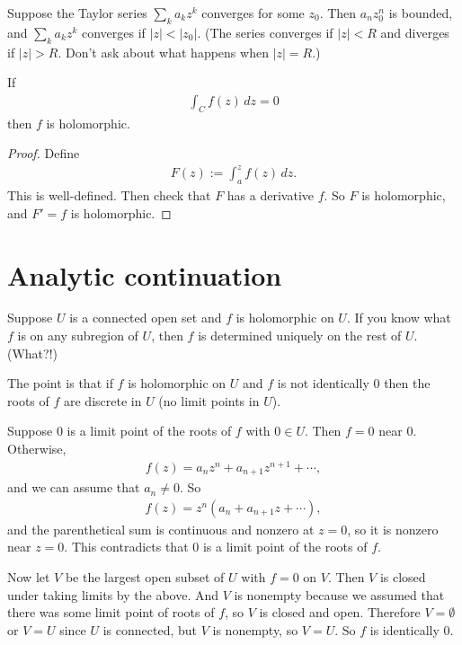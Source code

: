 \documentclass[11pt, oneside,margin=1in]{article}
\begin{document}
Suppose the Taylor series $\sum_{k}^{} a_kz^k$ converges for some $z_0$. Then $a_nz_0^n$ is bounded, and $\sum_{k}^{} a_kz^k$ converges if $\left\lvert z \right\rvert <\left\lvert z_0 \right\rvert $. (The series converges if $\left\lvert z \right\rvert < R$ and diverges if $\left\lvert z \right\rvert > R$. Don't ask about what happens when $\left\lvert z \right\rvert =R$.)

\begin{theorem}[Morera]\label{}\index{}\text{}
If 
\begin{align*}
	\int_{C}^{} f(z)  \, dz = 0 
\end{align*}
then $f$ is holomorphic.
\end{theorem}
\begin{proof}
Define
\begin{align*}
	F(z) :=  \int_{a}^{z} f(z)  \, dz. 
\end{align*}
This is well-defined. Then check that $F$ has a derivative $f$. So $F$ is holomorphic, and $F'=f$ is holomorphic.
\end{proof}


\section{Analytic continuation}
Suppose $U$ is a connected open set and $f$ is holomorphic on $U$. If you know what $f$ is on any subregion of $U$, then $f$ is determined uniquely on the rest of $U$. (What?!)

The point is that if $f$ is holomorphic on $U$ and $f$ is not identically $0$ then the roots of $f$ are discrete in $U$ (no limit points in $U$).

Suppose $0$ is a limit point of the roots of $f$ with $0\in U$. Then  $f=0$ near $0$. Otherwise, 
\begin{align*}
	f(z) =  a_nz^n + a_{n+1}z^{n+1} + \cdots,
\end{align*}
and we can assume that $a_n \ne 0$. So 
\begin{align*}
	f(z) = z^n (a_n + a_{n+1}z + \cdots),
\end{align*}
and the parenthetical sum is continuous and nonzero at $z=0$, so it is nonzero near $z=0$. This contradicts that $0$ is a limit point of the roots of $f$. 

Now let $V$ be the largest open subset of $U$ with $f=0$ on $V$. Then $V$ is closed under taking limits by the above. And $V$ is nonempty because we assumed that there was some limit point of roots of $f$, so $V$ is closed and open. Therefore $V=\emptyset$ or $V=U$ since $U$ is connected, but $V$ is nonempty, so $V=U$. So $f$ is identically $0$. 
\end{document}
